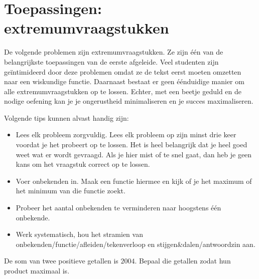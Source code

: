 \documentclass[a4paper,12pt,twoside]{article}
\begin{document}
\begin{oefening}
\begin{enumerate}[(a)]
\begin{center}
  \end{center}
\end{enumerate}
\end{oefening}

\cleardoublepage
\section{Toepassingen: extremumvraagstukken}

De volgende problemen zijn extremumvraagstukken. Ze zijn één van de belangrijkste toepassingen van de eerste afgeleide. Veel studenten zijn geïntimideerd door deze problemen omdat ze de tekst eerst moeten omzetten naar een wiskundige functie. Daarnaast bestaat er geen éénduidige manier om alle extremumvraagstukken op te lossen. Echter, met een beetje geduld en de nodige oefening kan je je ongerustheid minimaliseren en je succes maximaliseren.

Volgende tips kunnen alvast handig zijn:
\begin{itemize}
\item Lees elk probleem zorgvuldig. Lees elk probleem op zijn minst drie keer voordat je het probeert op te lossen. Het is heel belangrijk dat je heel goed weet wat er wordt gevraagd. Als je hier mist of te snel gaat, dan heb je geen kans om het vraagstuk correct op te lossen.
\item Voer onbekenden in. Maak een functie hiermee en kijk of je het maximum of het minimum van die functie zoekt.
\item Probeer het aantal onbekenden te verminderen naar hoogstens één onbekende.
\item Werk systematisch, hou het stramien van onbekenden/functie/afleiden/tekenverloop en stijgen\&dalen/antwoordzin aan.
\end{itemize}

\begin{oefening}
  De som van twee positieve getallen is $2004$. Bepaal die getallen zodat hun product maximaal is.
\end{oefening}
\end{document}
